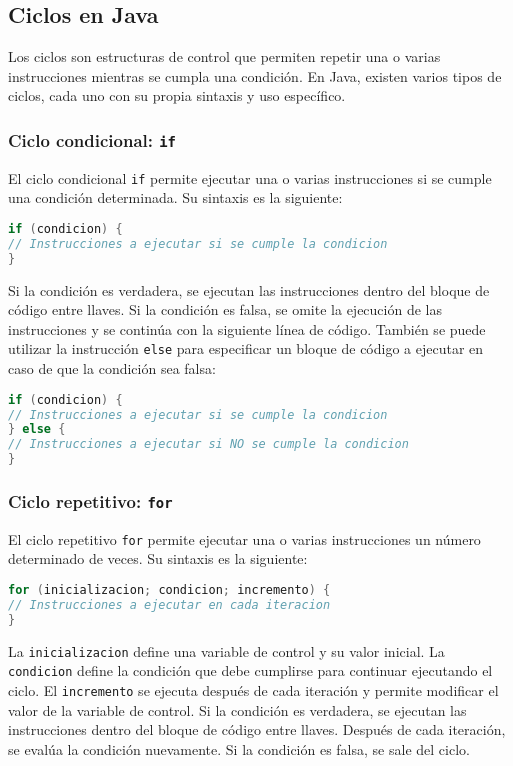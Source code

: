 \documentclass{article}
\begin{document}
\subsection{Ciclos en Java}

Los ciclos son estructuras de control que permiten repetir una o varias instrucciones mientras se cumpla una condición. En Java, existen varios tipos de ciclos, cada uno con su propia sintaxis y uso específico.

\subsubsection{Ciclo condicional: \texttt{if}}

El ciclo condicional \texttt{if} permite ejecutar una o varias instrucciones si se cumple una condición determinada. Su sintaxis es la siguiente:

\begin{lstlisting}[language=Java]
if (condicion) {
// Instrucciones a ejecutar si se cumple la condicion
}
\end{lstlisting}

Si la condición es verdadera, se ejecutan las instrucciones dentro del bloque de código entre llaves. Si la condición es falsa, se omite la ejecución de las instrucciones y se continúa con la siguiente línea de código. También se puede utilizar la instrucción \texttt{else} para especificar un bloque de código a ejecutar en caso de que la condición sea falsa:

\begin{lstlisting}[language=Java]
if (condicion) {
// Instrucciones a ejecutar si se cumple la condicion
} else {
// Instrucciones a ejecutar si NO se cumple la condicion
}
\end{lstlisting}

\subsubsection{Ciclo repetitivo: \texttt{for}}

El ciclo repetitivo \texttt{for} permite ejecutar una o varias instrucciones un número determinado de veces. Su sintaxis es la siguiente:

\begin{lstlisting}[language=Java]
for (inicializacion; condicion; incremento) {
// Instrucciones a ejecutar en cada iteracion
}
\end{lstlisting}

La \texttt{inicializacion} define una variable de control y su valor inicial. La \texttt{condicion} define la condición que debe cumplirse para continuar ejecutando el ciclo. El \texttt{incremento} se ejecuta después de cada iteración y permite modificar el valor de la variable de control. Si la condición es verdadera, se ejecutan las instrucciones dentro del bloque de código entre llaves. Después de cada iteración, se evalúa la condición nuevamente. Si la condición es falsa, se sale del ciclo.
\end{document}

